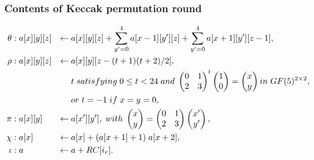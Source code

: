 \documentclass{beamer}
\begin{document}
\begin{frame}
\frametitle{Contents of Keccak permutation round}
\begin{align*}
  \theta &: a[x][y][z] & \gets & \thickspace a[x][y][z] + \displaystyle\sum\limits_{y' = 0}^{4} a[x - 1][y'][z] + \displaystyle\sum\limits_{y' = 0}^{4} a[x + 1][y'][z - 1], \\
  \rho &: a[x][y][z] & \gets & \thickspace a[x][y][z - (t + 1)(t + 2) / 2], \\
  & & & \thickspace t \thickspace satisfying \thickspace 0 \leq t < 24 \thickspace and \thickspace
  \begin{pmatrix} 0 & 1 \\ 2 & 3 \end{pmatrix}^{t} \begin{pmatrix} 1 \\ 0 \end{pmatrix} = \begin{pmatrix} x \\ y \end{pmatrix}
  in \thickspace GF(5)^{2 \times 2}, \\
  & & & \thickspace or \thickspace t = -1 \thickspace if \thickspace x = y = 0, \\
  \pi &: a[x][y] & \gets & \thickspace a[x'][y'], \thickspace with \thickspace
  \begin{pmatrix} x \\ y \end{pmatrix} = \begin{pmatrix} 0 & 1 \\ 2 & 3 \end{pmatrix} \begin{pmatrix} x' \\ y'\end{pmatrix}, \\
  \chi &: a[x] & \gets & \thickspace a[x] + (a[x + 1] + 1) \thickspace a[x + 2], \\
  \iota &: a & \gets & \thickspace a + RC[i_{r}].
\end{align*}
\end{frame}

\end{document}
